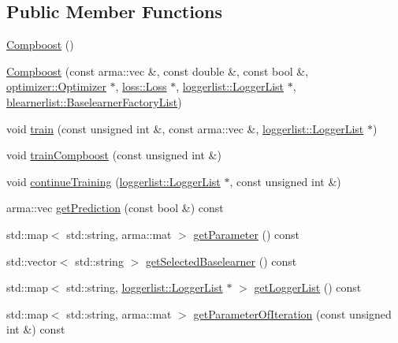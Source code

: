 \subsection*{Public Member Functions}
\begin{DoxyCompactItemize}
\item 
\hyperlink{classcboost_1_1_compboost_a5117b7b8cf0a424e736f6833bc5c3a68}{Compboost} ()
\item 
\hyperlink{classcboost_1_1_compboost_a24b98d64e9aac2a7a8ec4e64a49a1f7c}{Compboost} (const arma\+::vec \&, const double \&, const bool \&, \hyperlink{classoptimizer_1_1_optimizer}{optimizer\+::\+Optimizer} $\ast$, \hyperlink{classloss_1_1_loss}{loss\+::\+Loss} $\ast$, \hyperlink{classloggerlist_1_1_logger_list}{loggerlist\+::\+Logger\+List} $\ast$, \hyperlink{classblearnerlist_1_1_baselearner_factory_list}{blearnerlist\+::\+Baselearner\+Factory\+List})
\item 
void \hyperlink{classcboost_1_1_compboost_a5d0ec331d3a75a19b89c54b67e64acad}{train} (const unsigned int \&, const arma\+::vec \&, \hyperlink{classloggerlist_1_1_logger_list}{loggerlist\+::\+Logger\+List} $\ast$)
\item 
void \hyperlink{classcboost_1_1_compboost_a3689a0d4517ec30905ef5ae46b1cb9c9}{train\+Compboost} (const unsigned int \&)
\item 
void \hyperlink{classcboost_1_1_compboost_a0e72bc9f0d36d4a9f141978e445f2cdc}{continue\+Training} (\hyperlink{classloggerlist_1_1_logger_list}{loggerlist\+::\+Logger\+List} $\ast$, const unsigned int \&)
\item 
arma\+::vec \hyperlink{classcboost_1_1_compboost_a741143ae1cb41c54346e19f8bec3454d}{get\+Prediction} (const bool \&) const
\item 
std\+::map$<$ std\+::string, arma\+::mat $>$ \hyperlink{classcboost_1_1_compboost_a7b90eaa8107f91806b09ceedf8581537}{get\+Parameter} () const
\item 
std\+::vector$<$ std\+::string $>$ \hyperlink{classcboost_1_1_compboost_ac66d4490e6539832d4d304a86db746dc}{get\+Selected\+Baselearner} () const
\item 
std\+::map$<$ std\+::string, \hyperlink{classloggerlist_1_1_logger_list}{loggerlist\+::\+Logger\+List} $\ast$ $>$ \hyperlink{classcboost_1_1_compboost_a0376256bdfde1a50b420ad7412f4b4dd}{get\+Logger\+List} () const
\item 
std\+::map$<$ std\+::string, arma\+::mat $>$ \hyperlink{classcboost_1_1_compboost_a97b02aa81981e08658d896ff9798b5d0}{get\+Parameter\+Of\+Iteration} (const unsigned int \&) const

\end{DoxyCompactItemize}

